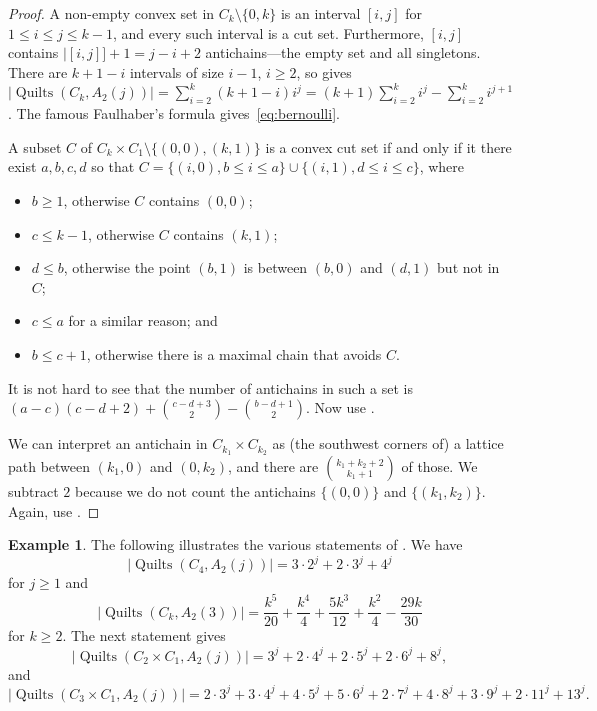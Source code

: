 \documentclass[12pt]{amsart}
\numberwithin{equation}{section}
\theoremstyle{definition}
\newtheorem{example}[theorem]{Example}
\newcommand{\quilt}{\operatorname{Quilts}}
\begin{document}
\begin{proof}
 A non-empty convex set in $C_k \setminus \{0,k\}$ is an interval $[i,j]$ for $1 \leq i \leq j \leq k-1$, and every such interval is a cut set. Furthermore, $[i,j]$ contains $|[i,j]]+1=j-i+2$ antichains---the empty set and all singletons. There are $k+1-i$ intervals of size $i-1$, $i \geq 2$, so  gives $|\quilt(C_k,A_2(j))| = \sum_{i=2}^k (k+1-i)i^j = (k+1) \sum_{i=2}^k i^j - \sum_{i=2}^k i^{j+1}$. The famous Faulhaber's formula gives~\eqref{eq:bernoulli}.

 A subset $C$ of $C_{k} \times C_1 \setminus \{(0,0),(k,1)\}$ is a convex
 cut set if and only if it there exist $a,b,c,d$ so that $C = \{(i,0), b \leq i \leq a\} \cup \{(i,1), d \leq i \leq c\}$, where
 \begin{itemize}
  \item $b \geq 1$, otherwise $C$ contains $(0,0)$;
  \item $c \leq k-1$, otherwise $C$ contains $(k,1)$;
  \item $d \leq b$, otherwise the point $(b,1)$ is between $(b,0)$ and $(d,1)$ but not in $C$;
  \item $c \leq a$ for a similar reason; and
  \item $b \leq c+1$, otherwise there is a maximal chain that avoids $C$.
 \end{itemize}
 It is not hard to see that the number of antichains in such a set is $(a-c)(c-d+2)+{\textstyle \binom{c-d+3}2}-{\textstyle \binom{b-d+1}2}$. Now use .

 We can interpret an antichain in $C_{k_1} \times C_{k_2}$ as (the southwest corners of) a lattice path between $(k_1,0)$ and $(0,k_2)$, and there are $\binom{k_1+k_2+2}{k_1+1}$ of those. We subtract $2$ because we do not count the antichains $\{(0,0)\}$ and $\{(k_1,k_2)\}$. Again, use .
\end{proof}



\begin{example} The following illustrates the various statements of .
 We have
 $$|\quilt(C_4,A_2(j))| = 3 \cdot 2^j + 2 \cdot 3^j + 4^j$$
 for $j \geq 1$ and
 $$|\quilt(C_k,A_2(3))| = \frac{k^5}{20}+\frac{k^4}{4}+\frac{5 k^3}{12}+\frac{k^2}{4}-\frac{29 k}{30}$$
 for $k \geq 2$. The next statement gives
 $$|\quilt(C_2 \times C_1,A_2(j))| = 3^j + 2 \cdot 4^j + 2 \cdot 5^j + 2 \cdot 6^j + 8^j,$$
 and
 $$|\quilt(C_3 \times C_1,A_2(j))| = 2 \cdot 3^j + 3 \cdot 4^j + 4 \cdot 5^j + 5 \cdot 6^j + 2 \cdot 7^j + 4 \cdot 8^j + 3 \cdot 9^j + 2 \cdot 11^j + 13^j.$$
\end{example}
\end{document}
